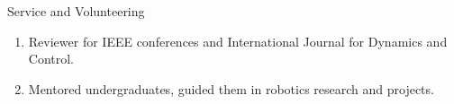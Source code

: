 \documentclass{resume}
\begin{document}
\begin{rSection}{Service and Volunteering}

\begin{enumerate}
    \item Reviewer for IEEE conferences and International Journal for Dynamics and Control.
    \item Mentored undergraduates, guided them in robotics research and projects.
\end{enumerate}
\end{rSection}

\newpage
\thispagestyle{reference}


\end{document}
